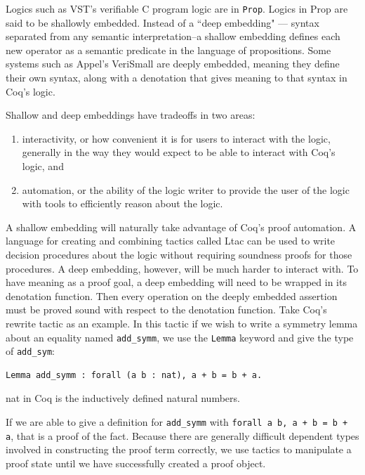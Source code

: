 \documentclass{puthesis}
\begin{document}
Logics such as VST's verifiable C program logic are in
\lstinline|Prop|. Logics in Prop are said to be shallowly embedded.
Instead of a ``deep embedding" --- syntax separated from any semantic
interpretation--a shallow embedding defines each new operator as a
semantic predicate in the language of propositions.  Some systems such
as Appel's VeriSmall \cite{appel11:cpp} are deeply embedded, meaning
they define their own syntax, along with a denotation that gives
meaning to that syntax in Coq's logic.

Shallow and deep embeddings have tradeoffs in two areas:

\begin{enumerate}
\item interactivity, or how convenient it is for users to interact
  with the logic, generally in the way they would expect to be able to
  interact with Coq's logic, and
\item automation, or the ability of the logic writer to provide the
  user of the logic with tools to efficiently reason about the logic.
\end{enumerate}

A shallow embedding will naturally take advantage of Coq's proof
automation. A language for creating and combining tactics called Ltac
can be used to write decision procedures about the logic without
requiring soundness proofs for those procedures. A deep embedding,
however, will be much harder to interact with. To have meaning as a
proof goal, a deep embedding will need to be wrapped in its denotation
function. Then every operation on the deeply embedded assertion must
be proved sound with respect to the denotation function. Take Coq's
rewrite tactic as an example. In this tactic if we wish to write a
symmetry lemma about an equality named \lstinline|add_symm|, we use
the \lstinline|Lemma| keyword and give the type of
\lstinline|add_sym|:

\begin{lstlisting}
Lemma add_symm : forall (a b : nat), a + b = b + a.
\end{lstlisting}
\noindent nat in Coq is the inductively defined natural numbers.

If we are able to give a definition for \lstinline|add_symm| with
\lstinline|forall a b, a + b = b + a|, that is a proof of the
fact. Because there are generally difficult dependent types involved
in constructing the proof term correctly, we use tactics to manipulate
a proof state until we have successfully created a proof object. 
\end{document}
